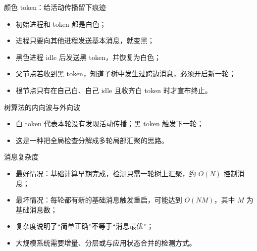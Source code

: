 \documentclass[UTF8,fontset=none,aspectratio=169,10pt]{beamer}
\begin{document}
\begin{frame}{颜色 token：给活动传播留下痕迹}
\begin{itemize}
  \item 初始进程和 token 都是白色；
  \item 进程只要向其他进程发送基本消息，就变黑；
  \item 黑色进程 idle 后发送黑 token，并恢复为白色；
  \item 父节点若收到黑 token，知道子树中发生过跨边消息，必须开启新一轮；
  \item 根节点只有在自己白、自己 idle 且收齐白 token 时才宣布终止。
\end{itemize}
\end{frame}

\begin{frame}{树算法的内向波与外向波}
\begin{center}
\end{center}
\begin{itemize}
  \item 白 token 代表本轮没有发现活动传播；黑 token 触发下一轮；
  \item 这是一种把全局检查分解成多轮局部汇聚的思路。
\end{itemize}
\end{frame}

\begin{frame}{消息复杂度}
\begin{itemize}
  \item 最好情况：基础计算早期完成，检测只需一轮树上汇聚，约 $O(N)$ 控制消息；
  \item 最坏情况：每轮都有新的基础消息触发重启，可能达到 $O(NM)$，其中 $M$ 为基础消息数；
  \item 复杂度说明了“简单正确”不等于“消息最优”；
  \item 大规模系统需要增量、分层或与应用状态合并的检测方式。
\end{itemize}
\end{frame}
\end{document}
